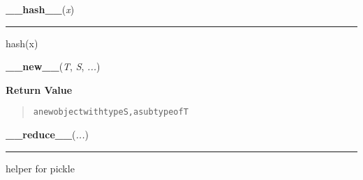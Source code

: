     \label{object:__hash__}

    \vspace{0.5ex}

    \begin{boxedminipage}{\textwidth}

    \raggedright \textbf{\_\_hash\_\_}(\textit{x})

    \vspace{-1.5ex}

    \rule{\textwidth}{0.5\fboxrule}
    hash(x)

    \vspace{1ex}

    \end{boxedminipage}

    \label{object:__new__}

    \vspace{0.5ex}

    \begin{boxedminipage}{\textwidth}

    \raggedright \textbf{\_\_new\_\_}(\textit{T}, \textit{S}, \textit{...})

    \vspace{1ex}

      \textbf{Return Value}
      \begin{quote}
\begin{alltt}
a new object with type S, a subtype of T
\end{alltt}

      \end{quote}

    \vspace{1ex}

    \end{boxedminipage}

    \label{object:__reduce__}

    \vspace{0.5ex}

    \begin{boxedminipage}{\textwidth}

    \raggedright \textbf{\_\_reduce\_\_}(\textit{...})

    \vspace{-1.5ex}

    \rule{\textwidth}{0.5\fboxrule}
    helper for pickle

    \vspace{1ex}

    \end{boxedminipage}

